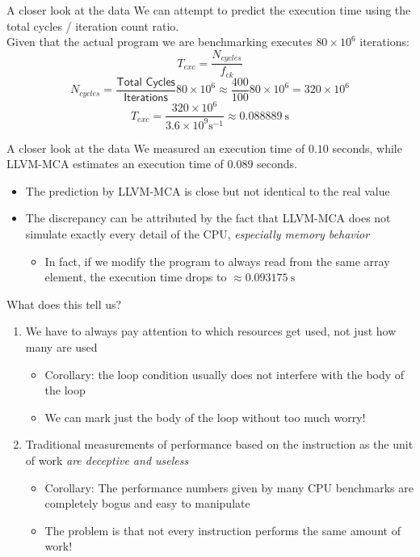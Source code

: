 \begin{frame}{A closer look at the data}
We can attempt to \alert{predict the execution time} using the total cycles / iteration count ratio.\\
\smallskip
Given that the actual program we are benchmarking executes $80\times10^{6}$ iterations:
\[
T_{exc} = \frac{N_{cycles}}{f_{ck}}
\]
\[
N_{cycles} = \frac{\textsf{Total Cycles}}{\textsf{Iterations}}80\times10^{6} \approx \frac{400}{100}80\times10^{6} = 320\times10^{6}
\]
\[
T_{exc} = \frac{320\times10^{6}}{3.6\times10^9 \si{\second}^{-1}} \approx \SI{0.088889}{\second}
\]
\end{frame}


\begin{frame}{A closer look at the data}
We measured an execution time of $0.10$ seconds, while LLVM-MCA estimates an execution time of $0.089$ seconds.
\bigskip
\begin{itemize}
\item The prediction by LLVM-MCA is close but not identical to the real value
\item The discrepancy can be attributed by the fact that LLVM-MCA does not simulate exactly every detail of the CPU, \emph{especially memory behavior}
	\begin{itemize}
	\item In fact, if we modify the program to always read from the same array element,
	the execution time drops to $\approx \SI{0.093175}{\second}$
	\end{itemize}
\end{itemize}
\end{frame}


\begin{frame}{What does this tell us?}
\large
\begin{enumerate}
\item We have to always pay attention to \alert{which} resources get used, not just how many are used
	\medskip
	\begin{itemize}
	\item Corollary: the loop condition usually does not interfere with the body of the loop
	\item We can mark just the body of the loop without too much worry!
	\end{itemize}
\bigskip
\item Traditional measurements of performance based on the instruction as the unit of work \emph{are deceptive and useless}
	\medskip
	\begin{itemize}
	\item Corollary: The performance numbers given by many CPU benchmarks are completely bogus and easy to manipulate
	\item The problem is that not every instruction performs the same amount of work!
	\end{itemize}
\end{enumerate}
\end{frame}


